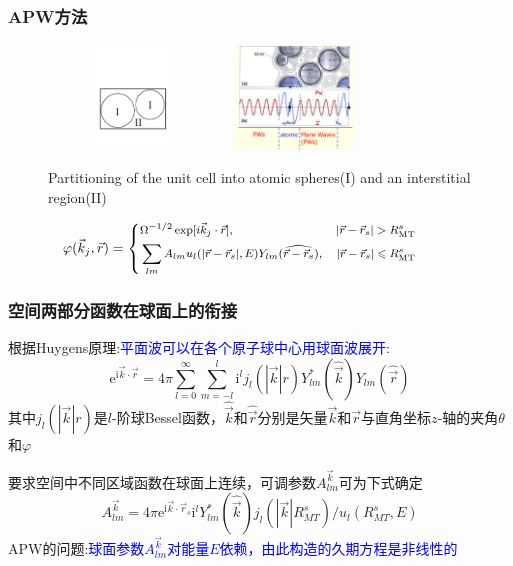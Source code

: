 \documentclass[cjk,slidestop,compress,mathserif,blue]{beamer}
\begin{document}
\frame
{
\frametitle{\textrm{APW}方法}
\begin{figure}[h!]
\centering
\includegraphics[height=1.10in,width=1.80in,viewport=40 150 545 465,clip]{Figures/Muffin_tin.pdf}
\includegraphics[height=1.10in,width=1.45in,viewport=1 20 485 435,clip]{Figures/APW.png}
\caption{\tiny \textrm{Partitioning of the unit cell into atomic spheres(I) and an interstitial region(II)}}%
\label{Muffin_tin-2}
\end{figure}
\begin{displaymath}
\hskip -28pt\footnotesize \varphi(\vec k_j,\vec r)=\left\{
  \begin{aligned}
    &\Omega^{-1/2}\exp[i\vec k_j\cdot\vec r],&|\vec r-\vec r_s|>R_{\mathrm{MT}}^s\\
    &\sum_{lm}A_{lm}u_l(|\vec r-\vec r_s|,E)Y_{lm}(\widehat{\vec r-\vec r_s}),&|\vec r-\vec r_s|\leqslant R_{\mathrm{MT}}^s
  \end{aligned}
\right.
\end{displaymath}
}

\frame
{
	\frametitle{空间两部分函数在球面上的衔接}
	根据\textrm{Huygens}原理:\textcolor{blue}{平面波可以在各个原子球中心用球面波展开}:
	\begin{displaymath}
		\mathrm{e}^{\mathrm{i}\vec k\cdot\vec r}=4\pi\sum_{l=0}^{\infty}\sum_{m=-l}^l\mathrm{i}^lj_l(|\vec k|r)Y_{lm}^{\ast}(\hat{\vec k})Y_{lm}(\hat{\vec r})
	\end{displaymath}
	其中$j_l(|\vec k|r)$是$l$-阶球\textrm{Bessel}函数，$\hat{\vec k}$和$\hat{\vec r}$分别是矢量$\vec k$和$\vec r$与直角坐标$z$-轴的夹角$\theta$和$\varphi$

	要求空间中不同区域函数在球面上连续，可调参数$A_{lm}^{\vec k}$可为下式确定
\begin{displaymath}
	A_{lm}^{\vec k}=4\pi\mathrm{e}^{\mathrm{i}\vec k\cdot\vec r_s}\mathrm{i}^lY_{lm}^{\ast}(\hat{\vec k})j_l(|\vec k|R_{MT}^s)/u_l(R_{MT}^s,E)
\end{displaymath}
\textrm{APW}的问题:\textcolor{blue}{球面参数$A_{lm}^{\vec k}$对能量$E$依赖，由此构造的久期方程是非线性的}
}
\end{document}
